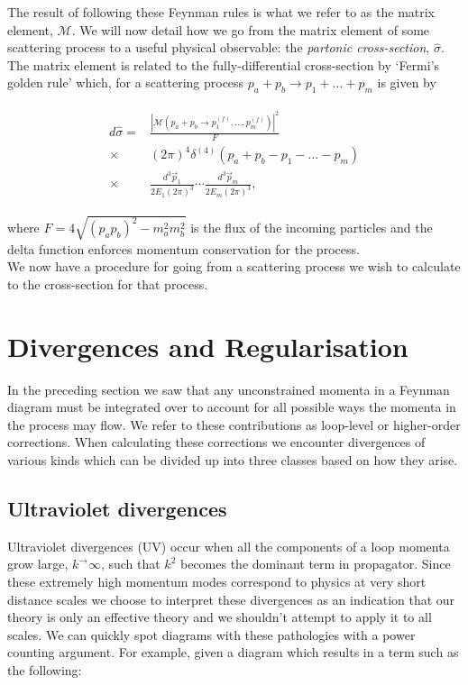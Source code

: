 	The result of following these Feynman rules is what we refer to as the matrix element, $\mathcal{M}$.  We will now detail how
	we go from the matrix element of some scattering process to a useful physical observable: the \emph{partonic cross-section},
	$\hat{\sigma}$.  The matrix element is related to the fully-differential cross-section by `Fermi's golden rule' which, for
	a scattering process $p_{a} + p_{b}\rightarrow p_{1} + \ldots + p_{m}$ is given by

	\begin{align}
	\begin{split}
		d\hat{\sigma} = &\frac{|\mathcal{M}(p_{a} + p_{b}\rightarrow p_{1}^{(f)}, \ldots, p_{m}^{(f)})|^2}{F}\\
		\times&(2\pi)^4\delta^{(4)}(p_{a} + p_{b} - p_{1} - \ldots - p_{m}) \\
		\times&\frac{d^3\vec{p}_1}{2E_1(2\pi)^3}\cdots\frac{d^3\vec{p}_m}{2E_m(2\pi)^3},
	\end{split}
	\end{align}

	where $F=4\sqrt{(p_ap_b)^2 - m_a^2m_b^2}$ is the flux of the incoming particles and the delta function
	enforces momentum conservation for the process.\\We now have a procedure for going from a scattering process
	we wish to calculate to the cross-section for that process.

\section{Divergences and Regularisation}
	\label{sec:divAndReg}

	In the preceding section we saw that any unconstrained momenta in a Feynman diagram must be integrated over to account
	for all possible ways the momenta in the process may flow.  We refer to these contributions as loop-level or
	higher-order corrections.  When calculating these corrections we encounter divergences of various kinds which can be
	divided up into three classes based on how they arise.

	\subsection{Ultraviolet divergences}

		Ultraviolet divergences (UV) occur when all the components of a loop momenta grow large,
		$k^\rightarrow\infty$, such that $k^2$ becomes the dominant term in propagator.
		Since these extremely high momentum modes correspond to physics at very short distance scales
		we choose to interpret these divergences as an indication that our theory is only an effective
		theory and we shouldn't attempt to apply it to all scales.  We can quickly spot diagrams with these
		pathologies with a power counting argument.  For example, given a diagram which results in a
		term such as the following:

